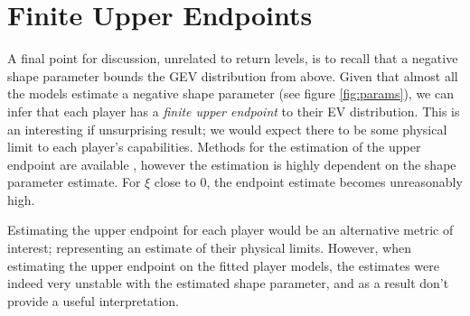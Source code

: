 \documentclass[12pt, TexShade, letterpaper]{report}
\begin{document}
\section{Finite Upper Endpoints}
A final point for discussion, unrelated to return levels, is to recall that 
a negative shape parameter bounds the GEV distribution from above. Given that almost all the models estimate a negative shape parameter (see figure \ref{fig:params}), we can infer that each player has a \textit{finite upper endpoint} to their EV distribution. This is an interesting if unsurprising result; we would expect there to be some physical limit to each player's capabilities. Methods for the estimation of the upper endpoint are available \cite{alves2016}, however the estimation is highly dependent on the shape parameter estimate. For $\xi$ close to 0, the endpoint estimate becomes unreasonably high.

Estimating the upper endpoint for each player would be an alternative metric of interest; representing an estimate of their physical limits. However, when estimating the upper endpoint on the fitted player models, the estimates were indeed very unstable with the estimated shape parameter, and as a result don't provide a useful interpretation.

\printbibliography
\end{document}

